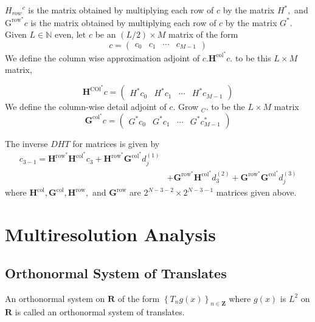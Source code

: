 ${H_{row}}^{c}$ is the matrix obtained by multiplying each row of $c$ by the matrix
$H^{*},$ and $\mathrm{G}^{\mathrm{row}^{*}} c$ is the matrix obtained by multiplying each row of $c$ by the matrix $G^{*}$. Given $L \in \mathbb{N}$ even, let $c$ be an $(L / 2) \times M$ matrix of the form
$$
c=\left(\begin{array}{cccc}{c_{0}} & {c_{1}} & {\cdots} & {c_{M-1}}\end{array}\right)
$$
We define the column wise approximation adjoint of $c . \mathbf{H}^{\mathrm{col}^{*}} c .$ to be this $L \times M$ matrix,

$$
\mathbf{H}^{\mathrm{COl}^{*}} c=\left(\begin{array}{cccc}{H^{*} c_{0}} & {H^{*} c_{1}} & {\cdots} & {H^{*} c_{M-1}}\end{array}\right)
$$
We define the column-wise detail adjoint of $c .$ Grow $_{C} .$ to be the $L \times M$
matrix
$$
\mathbf{G}^{\mathrm{col}^{*}} c=\left(\begin{array}{cccc}{G^{*} c_{0}} & {G^{*} c_{1}} & {\cdots} & {G^{*} c_{M-1}^{*}}\end{array}\right)
$$

The inverse $D H T$ for matrices is given by
$$
\begin{aligned} c_{3-1}=\mathbf{H}^{\mathrm{row}^{*}} \mathbf{H}^{\mathrm{col}^{*}} c_{3}+\mathbf{H}^{\mathrm{row}^{*}} \mathbf{G}^{\mathrm{col}^{*}} d_{j}^{(1)} \\ &+\mathbf{G}^{\mathrm{row}^{*}} \mathbf{H}^{\mathrm{col}^{*}} d_{3}^{(2)}+\mathbf{G}^{\mathrm{row}^{*}} \mathbf{G}^{\mathrm{col}^{*}} d_{j}^{(3)} \end{aligned}
$$
where $\mathbf{H}^{\mathrm{col}}, \mathbf{G}^{\mathrm{col}}, \mathbf{H}^{\mathrm{row}},$ and $\mathbf{G}^{\mathrm{row}}$ are $2^{N-3-2} \times 2^{N-3-1}$ matrices given above.


\section{Multiresolution Analysis}

\subsection{Orthonormal System of Translates}
\begin{definition}
An orthonormal system on $\mathbf{R}$ of the form $\left\{T_{n} g(x)\right\}_{n \in \mathbf{Z}}$ where $g(x)$ is $L^{2}$ on $\mathbf{R}$ is called an orthonormal system of translates.
\end{definition}

